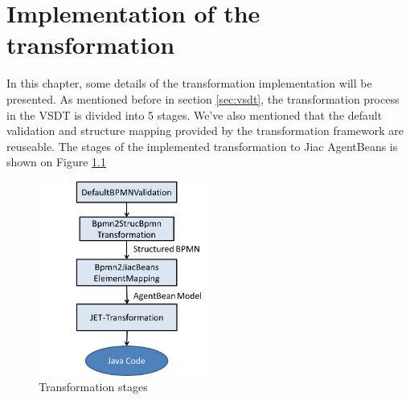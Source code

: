 \chapter{Implementation of the transformation}
\label{chap:implementation}

In this chapter, some details of the transformation implementation will be presented. As mentioned before in section \ref{sec:vsdt}, the transformation process in the VSDT is divided into 5 stages. We've also mentioned that the default validation and structure mapping provided by the transformation framework are reuseable. The stages of the implemented transformation to Jiac AgentBeans is shown on Figure \ref{fig:implementation_stages}

\begin{figure}[h]
	\centering		\includegraphics[width=0.5\textwidth]{images/implementation_stages.png}
	\caption{Transformation stages}
	\label{fig:implementation_stages}
\end{figure}
